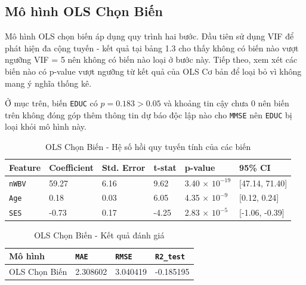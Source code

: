 \subsection{Mô hình OLS Chọn Biến}

Mô hình OLS chọn biến áp dụng quy trình hai bước. Đầu tiên sử dụng VIF để phát hiện đa cộng tuyến - kết quả tại bảng 1.3 cho thấy không có biến nào vượt ngưỡng VIF = 5 nên không có biến nào loại ở bước này. Tiếp theo, xem xét các biến nào có p-value vượt ngưỡng từ kết quả của OLS Cơ bản để loại bỏ vì không mang ý nghĩa thống kê.

Ở mục trên, biến \texttt{EDUC} có $p = 0.183 > 0.05$ và khoảng tin cậy chưa 0 nên biến trên không đóng góp thêm thông tin dự báo độc lập nào cho \texttt{MMSE} nên \texttt{EDUC} bị loại khỏi mô hình này.

\begin{table}[H]
    \centering
    \renewcommand{\arraystretch}{1.3}
    \setlength{\tabcolsep}{6pt}
    \begin{tabular}{|p{2cm}|p{2.25cm}|p{2.5cm}|p{1.8cm}|p{2.2cm}|p{3.2cm}|}
        \hline
        \rowcolor[rgb]{0.8, 0.9, 1.0}
        \textbf{Feature} & \textbf{Coefficient} & \textbf{Std. Error} & \textbf{t-stat} & \textbf{p-value} & \textbf{95\% CI} \\ \hline
        \texttt{nWBV} & 59.27 & 6.16 & 9.62 & 3.40 $\times$ $10^{-19}$ & [47.14, 71.40] \\ \hline
        \texttt{Age} & 0.18 & 0.03 & 6.05 & 4.35 $\times$ $10^{-9}$ & [0.12, 0.24] \\ \hline
        \texttt{SES} & -0.73 & 0.17 & -4.25 & 2.83 $\times$ $10^{-5}$ & [-1.06, -0.39] \\ \hline
    \end{tabular}
    \caption{OLS Chọn Biến - Hệ số hồi quy tuyến tính của các biến}
\end{table}

\begin{table}[H]
    \centering
    \renewcommand{\arraystretch}{1.3}
    \setlength{\tabcolsep}{10pt}
    \begin{tabular}{|p{3cm}|p{2.5cm}|p{2.5cm}|p{2.5cm}|}
        \hline
        \rowcolor[rgb]{0.8, 0.9, 1.0}
        \textbf{Mô hình} & \textbf{\texttt{MAE}} & \textbf{\texttt{RMSE}} & \textbf{\texttt{R2\_test}} \\ \hline
        OLS Chọn Biến & 2.308602 & 3.040419 & -0.185195 \\ \hline
    \end{tabular}
    \caption{OLS Chọn Biến - Kết quả đánh giá}
\end{table}

